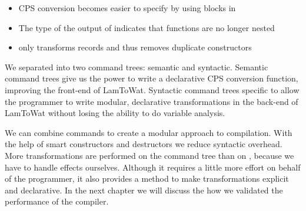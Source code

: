 \begin{itemize}
\item CPS conversion becomes easier to specify by using blocks in 
\item The type of the output of  indicates that functions are no longer nested
\item {} only transforms records and thus removes duplicate constructors
\end{itemize}

We separated  into two command trees: semantic and syntactic. Semantic command trees give us the power to write a declarative CPS conversion function, improving the front-end of LamToWat. Syntactic command trees specific to  allow the programmer to write modular, declarative transformations in the back-end of LamToWat without losing the ability to do variable analysis.

We can combine commands to create a modular approach to compilation. With the help of smart constructors and destructors we reduce syntactic overhead. More transformations are performed on the command tree than on , because we have to handle effects ourselves. Although it requires a little more effort on behalf of the programmer, it also provides a method to make transformations explicit and declarative. In the next chapter we will discuss the how we validated the performance of the compiler.
